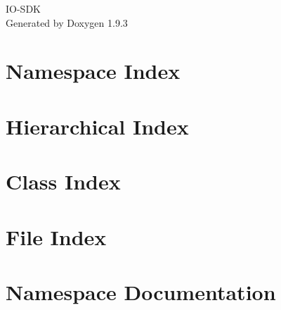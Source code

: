 \documentclass[twoside]{book}
\newcommand{\+}{\discretionary{\mbox{\scriptsize$\hookleftarrow$}}{}{}}
\newcommand{\clearemptydoublepage}{%
    \newpage{\pagestyle{empty}\cleardoublepage}%
  }
\begin{document}
  \raggedbottom
    \hypersetup{pageanchor=false,
                bookmarksnumbered=true,
                pdfencoding=unicode
               }
  \begin{titlepage}
  \vspace*{7cm}
  \begin{center}%
  {\Large IO-\/\+SDK}\\
  \vspace*{1cm}
  {\large Generated by Doxygen 1.9.3}\\
  \end{center}
  \end{titlepage}
  \clearemptydoublepage
  \tableofcontents
  \clearemptydoublepage
  \hypersetup{pageanchor=true}
\chapter{Namespace Index}

\chapter{Hierarchical Index}

\chapter{Class Index}

\chapter{File Index}

\chapter{Namespace Documentation}























\end{document}
